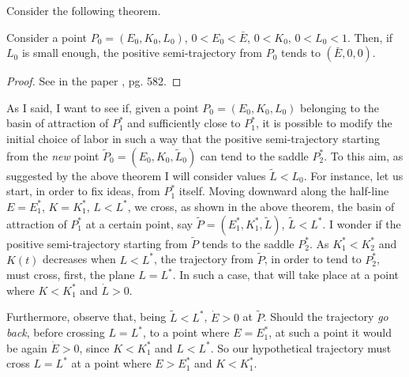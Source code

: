 Consider the following theorem.
\begin{thm} \label{thm:6_attracting_limit_pnt}
	Consider a point $P_0 = (E_0,K_0,L_0)$, $0<E_0<\bar{E}$, $0<K_0$, $0<L_0<1$. Then, if $L_0$ is small enough, the positive semi-trajectory from $P_0$ tends to $(\bar{E},0,0)$.
\end{thm}
\begin{proof}
	See in the paper \cite{antoci_poverty_2011}, pg. 582.
\end{proof}
As I said, I want to see if, given a point $P_0 = (E_0,K_0,L_0)$ belonging to the basin of attraction of $P_1^*$ and sufficiently close to $P_1^*$, it is possible to modify the initial choice of labor in such a way that the positive semi-trajectory starting from the \textit{new} point $\widetilde{P}_0 = (E_0,K_0,\widetilde{L}_0)$ can tend to the saddle $P_2^*$. To this aim, as suggested by the above theorem I will consider values $\widetilde{L}<L_0$. For instance, let us start, in order to fix ideas, from $P_1^*$ itself. Moving downward along the half-line $E = E_1^*$, $K = K_1^*$, $L < L^*$, we cross, as shown in the above theorem, the basin of attraction of $P_1^*$ at a certain point, say $\widetilde{P}=(E_1^*,K_1^*,\widetilde{L})$, $\widetilde{L}<L^*$. I wonder if the positive
semi-trajectory starting from $\widetilde{P}$ tends to the saddle $P_2^*$. As $K_1^*<K_2^*$ and $K(t)$ decreases when $L<L^*$, the trajectory from $\widetilde{P}$, in order to tend to $P_2^*$, must cross, first, the plane $L = L^*$. In such a case, that will take place at a point where $K<K_1^*$ and $\dot{L}>0$.

Furthermore, observe that, being $\widetilde{L}<L^*$, $\dot{E}>0$ at $\widetilde{P}$. Should the trajectory \textit{go back}, before crossing $L = L^*$, to a point where $E= E_1^*$, at such a point it would be again $\dot{E}>0$, since $K<K_1^*$ and $L<L^*$. So our hypothetical trajectory must cross $L = L^*$ at a point where $E>E_1^*$ and $K<K_1^*$.

